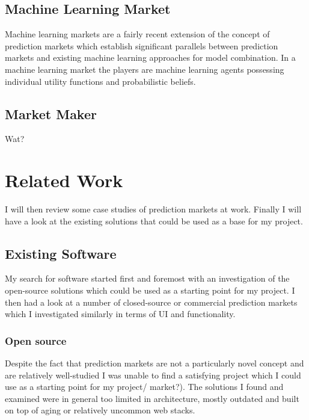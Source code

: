 \documentclass[bsc,frontabs,twoside,singlespacing,parskip,deptreport]{infthesis}     %
\begin{document}
\section{Machine Learning Market}
    Machine learning markets are a fairly recent extension of the concept of prediction markets which establish significant parallels between prediction markets and existing machine learning approaches for model combination. In a machine learning market the players are machine learning agents possessing individual utility functions and probabilistic beliefs. 
 
\section{Market Maker}
    Wat?

\chapter{Related Work}

I will then review some case studies of prediction markets at work. Finally I will have a look at the existing solutions that could be used as a base for my project.

\section{Existing Software}
%
    My search for software started first and foremost with an investigation of the open-source solutions which could be used as a starting point for my project. I then had a look at a number of closed-source or commercial prediction markets which I investigated similarly in terms of UI and functionality.   
    
\subsection{Open source}
    Despite the fact that prediction markets are not a particularly novel concept and are relatively well-studied I was unable to find a satisfying project which I could use as a starting point for my project/ market?). The solutions I found and examined were in general too limited in architecture, mostly outdated and built on top of aging or relatively uncommon web stacks.
\end{document}
